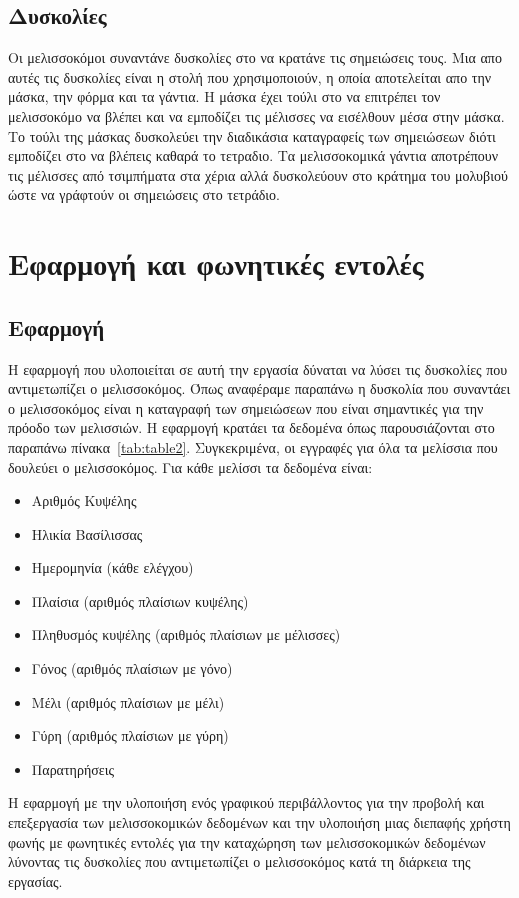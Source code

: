 \documentclass[oneside, 12pt]{book}
\begin{document}
\section{Δυσκολίες}\label{sec:δυσκολίες}
Οι μελισσοκόμοι συναντάνε δυσκολίες στο να κρατάνε τις σημειώσεις τους.
Μια απο αυτές τις δυσκολίες είναι η στολή που χρησιμοποιούν, η οποία αποτελείται απο την μάσκα, την
φόρμα και τα γάντια.
Η μάσκα έχει τούλι στο να επιτρέπει τον μελισσοκόμο να βλέπει και να εμποδίζει τις μέλισσες να
εισέλθουν μέσα στην μάσκα.
Το τούλι της μάσκας δυσκολεύει την διαδικάσια καταγραφείς των σημειώσεων διότι εμποδίζει στο να
βλέπεις καθαρά το τετραδιο.
Τα μελισσοκομικά γάντια αποτρέπουν τις μέλισσες από τσιμπήματα στα χέρια αλλά δυσκολεύουν στο
κράτημα του μολυβιού ώστε να γράφτούν οι σημειώσεις στο τετράδιο.
\chapter{Εφαρμογή και φωνητικές εντολές}
\label{ch:εφαρμογή-και-φωνητικές-εντολές}
\section{Εφαρμογή}
\label{sec:εφαρμογή}
Η εφαρμογή που υλοποιείται σε αυτή την εργασία δύναται να λύσει τις δυσκολίες που αντιμετωπίζει ο
μελισσοκόμος.
Όπως αναφέραμε παραπάνω η δυσκολία που συναντάει ο μελισσοκόμος είναι η καταγραφή των σημειώσεων που
είναι σημαντικές για την πρόοδο των μελισσιών.
Η εφαρμογή κρατάει τα δεδομένα όπως παρουσιάζονται στο παραπάνω πίνακα~\ref{tab:table2}.
Συγκεκριμένα, οι εγγραφές για όλα τα μελίσσια που δουλεύει ο μελισσοκόμος. \newline
Για κάθε μελίσσι τα δεδομένα είναι:
\begin{itemize}
  \item Αριθμός Κυψέλης
  \item Ηλικία Βασίλισσας
  \item Ημερομηνία (κάθε ελέγχου)
  \item Πλαίσια (αριθμός πλαίσιων κυψέλης)
  \item Πληθυσμός κυψέλης (αριθμός πλαίσιων με μέλισσες)
  \item Γόνος (αριθμός πλαίσιων με γόνο)
  \item Μέλι (αριθμός πλαίσιων με μέλι)
  \item Γύρη (αριθμός πλαίσιων με γύρη)
  \item Παρατηρήσεις
\end{itemize}
Η εφαρμογή με την υλοποιήση ενός γραφικού περιβάλλοντος για την προβολή και επεξεργασία των
μελισσοκομικών δεδομένων και την υλοποιήση μιας διεπαφής χρήστη φωνής με φωνητικές εντολές για την
καταχώρηση των μελισσοκομικών δεδομένων λύνοντας τις δυσκολίες που αντιμετωπίζει ο μελισσοκόμος κατά
τη διάρκεια της εργασίας.
\end{document}
